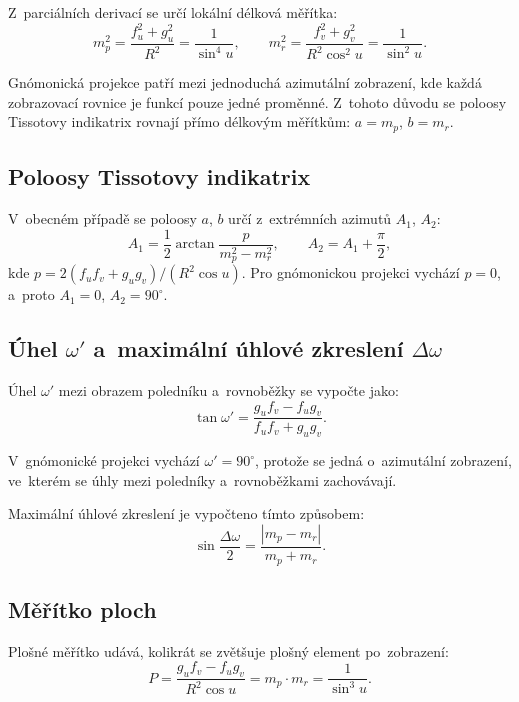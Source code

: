 \documentclass[11pt, a4paper]{article}
\begin{document}
Z~parciálních derivací se určí lokální délková měřítka:
\begin{equation}
    m_p^2 = \frac{f_u^2 + g_u^2}{R^2} = \frac{1}{\sin^4 u}, \qquad
    m_r^2 = \frac{f_v^2 + g_v^2}{R^2 \cos^2 u} = \frac{1}{\sin^2 u}.
\end{equation}

Gnómonická projekce patří mezi jednoduchá azimutální zobrazení, kde každá zobrazovací rovnice je funkcí pouze jedné proměnné. Z~tohoto důvodu se poloosy Tissotovy indikatrix rovnají přímo délkovým měřítkům: $a = m_p$, $b = m_r$.

\subsection{Poloosy Tissotovy indikatrix}

V~obecném případě se poloosy $a$, $b$ určí z~extrémních azimutů $A_1$, $A_2$:
\begin{equation}
    A_1 = \frac{1}{2} \arctan \frac{p}{m_p^2 - m_r^2}, \qquad A_2 = A_1 + \frac{\pi}{2},
\end{equation}
kde $p = 2(f_u f_v + g_u g_v) / (R^2 \cos u)$. Pro gnómonickou projekci vychází $p = 0$, a~proto $A_1 = 0$, $A_2 = 90^{\circ}$.

\subsection{Úhel $\omega'$ a~maximální úhlové zkreslení $\Delta\omega$}

Úhel $\omega'$ mezi obrazem poledníku a~rovnoběžky se vypočte jako:
\begin{equation}
    \tan \omega' = \frac{g_u f_v - f_u g_v}{f_u f_v + g_u g_v}.
\end{equation}

V~gnómonické projekci vychází $\omega' = 90^{\circ}$, protože se jedná o~azimutální zobrazení, ve~kterém se úhly mezi poledníky a~rovnoběžkami zachovávají.

Maximální úhlové zkreslení je vypočteno tímto způsobem:
\begin{equation}
    \sin \frac{\Delta\omega}{2} = \frac{|m_p - m_r|}{m_p + m_r}.
\end{equation}

\subsection{Měřítko ploch}

Plošné měřítko udává, kolikrát se zvětšuje plošný element po~zobrazení:
\begin{equation}
    P = \frac{g_u f_v - f_u g_v}{R^2 \cos u} = m_p \cdot m_r = \frac{1}{\sin^3 u}.
\end{equation}
\end{document}

